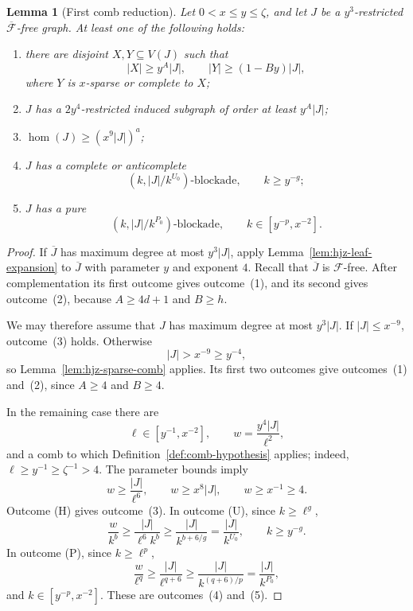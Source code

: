 \documentclass[11pt]{article}
\numberwithin{equation}{section}
\theoremstyle{plain}
\newtheorem{lemma}[theorem]{Lemma}
\theoremstyle{definition}
\begin{document}
\begin{lemma}[First comb reduction]
\label{lem:hjz-modified-first}
Let $0<x\leq y\leq\zeta$, and let $J$ be a $y^3$-restricted
$\overline{\mathcal F}$-free graph.  At least one of the following
holds:
\begin{enumerate}
\item there are disjoint $X,Y\subseteq V(J)$ such that
\[
 |X|\geq y^A|J|,\qquad |Y|\geq(1-By)|J|,
\]
where $Y$ is $x$-sparse or complete to $X$;
\item $J$ has a $2y^4$-restricted induced subgraph of order at least
      $y^A|J|$;
\item $\operatorname{hom}(J)\geq(x^9|J|)^a$;
\item $J$ has a complete or anticomplete
\[
             (k,|J|/k^{U_0})\text{-blockade},
             \qquad k\geq y^{-g};
\]
\item $J$ has a pure
\[
             (k,|J|/k^{P_0})\text{-blockade},
             \qquad k\in[y^{-p},x^{-2}].
\]
\end{enumerate}
\end{lemma}

\begin{proof}
If $\overline J$ has maximum degree at most $y^3|J|$, apply
Lemma~\ref{lem:hjz-leaf-expansion} to $\overline J$ with parameter $y$
and exponent $4$.  Recall that $\overline J$ is $\mathcal F$-free.
After complementation its first outcome gives outcome~(1), and its
second gives outcome~(2), because $A\geq4d+1$ and $B\geq h$.

We may therefore assume that $J$ has maximum degree at most
$y^3|J|$.  If $|J|\leq x^{-9}$, outcome~(3) holds.  Otherwise
\[
                  |J|>x^{-9}\geq y^{-4},
\]
so Lemma~\ref{lem:hjz-sparse-comb} applies.  Its first two outcomes
give outcomes~(1) and~(2), since $A\geq4$ and $B\geq4$.

In the remaining case there are
\[
 \ell\in[y^{-1},x^{-2}],\qquad
 w=\frac{y^4|J|}{\ell^2},
\]
and a comb to which Definition~\ref{def:comb-hypothesis} applies;
indeed, $\ell\geq y^{-1}\geq\zeta^{-1}>4$.  The parameter bounds imply
\begin{equation}
                       w\geq\frac{|J|}{\ell^6},
             \qquad    w\geq x^8|J|,
             \qquad    w\geq x^{-1}\geq4.
\label{eq:hjz-comb-width}
\end{equation}
Outcome (H) gives outcome~(3).  In outcome (U), since
$k\geq\ell^g$,
\[
 \frac{w}{k^b}
       \geq \frac{|J|}{\ell^6k^b}
       \geq \frac{|J|}{k^{b+6/g}}
       =\frac{|J|}{k^{U_0}},
 \qquad k\geq y^{-g}.
\]
In outcome (P), since $k\geq\ell^p$,
\[
 \frac{w}{\ell^q}
       \geq \frac{|J|}{\ell^{q+6}}
       \geq \frac{|J|}{k^{(q+6)/p}}
       =\frac{|J|}{k^{P_0}},
\]
and $k\in[y^{-p},x^{-2}]$.  These are outcomes~(4) and~(5).
\end{proof}
\end{document}

